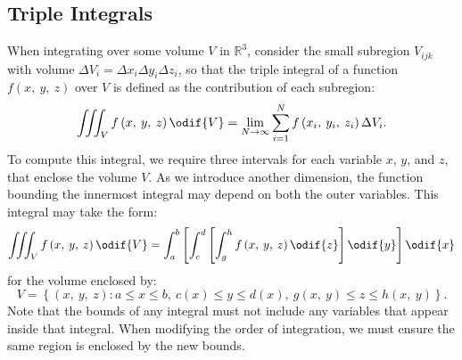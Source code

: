 \documentclass{article}
\begin{document}
\subsection{Triple Integrals}
When integrating over some volume \(V\) in \(\mathbb{R}^3\), consider
the small subregion \(V_{ijk}\) with volume \(\Delta V_i = \Delta x_i
\Delta y_i \Delta z_i\), so that the triple integral of a function
\(f\left( x, \: y, \: z \right)\) over \(V\) is defined as the
contribution of each subregion:
\begin{equation*}
    \iiint_{V} f\left( x, \: y, \: z \right) \odif{V} = \lim_{N \to \infty} \sum_{i=1}^{N} f\left( x_i, \: y_i, \: z_i \right) \Delta V_i.
\end{equation*}
To compute this integral, we require three intervals for each variable
\(x\), \(y\), and \(z\), that enclose the volume \(V\). As we introduce
another dimension, the function bounding the innermost integral may
depend on both the outer variables. This integral may take the form:
\begin{equation*}
    \iiint_{V} f\left( x, \: y, \: z \right) \odif{V} = \int_a^b \left[ \int_c^d \left[ \int_g^h f\left( x, \: y, \: z \right) \odif{z} \right] \odif{y} \right] \odif{x}
\end{equation*}
for the volume enclosed by:
\begin{equation*}
    V = \left\{ \left( x, \: y, \: z \right) : a \leqslant x \leqslant b, \: c\left( x \right) \leqslant y \leqslant d\left( x \right), \: g\left( x, \: y \right) \leqslant z \leqslant h\left( x, \: y \right) \right\}.
\end{equation*}
Note that the bounds of any integral must not include any variables that
appear inside that integral. When modifying the order of integration,
we must ensure the same region is enclosed by the new bounds.
\end{document}
